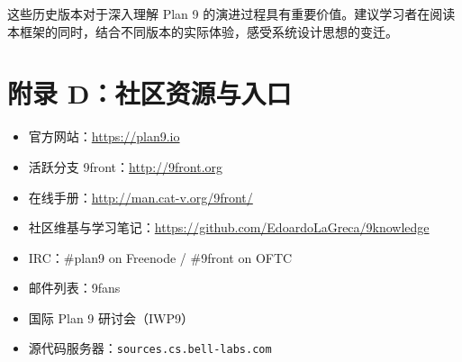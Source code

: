 \documentclass[12pt,UTF8]{ctexbook}
\begin{document}
这些历史版本对于深入理解 Plan 9 的演进过程具有重要价值。建议学习者在阅读本框架的同时，结合不同版本的实际体验，感受系统设计思想的变迁。

\chapter*{附录 D：社区资源与入口}

\begin{itemize}
	\item 官方网站：\url{https://plan9.io}
	\item 活跃分支 9front：\url{http://9front.org}
	\item 在线手册：\url{http://man.cat-v.org/9front/}
	\item 社区维基与学习笔记：\url{https://github.com/EdoardoLaGreca/9knowledge}
	\item IRC：\#plan9 on Freenode / \#9front on OFTC
	\item 邮件列表：9fans
	\item 国际 Plan 9 研讨会（IWP9）
	\item 源代码服务器：\texttt{sources.cs.bell-labs.com}
\end{itemize}
	
\end{document}
